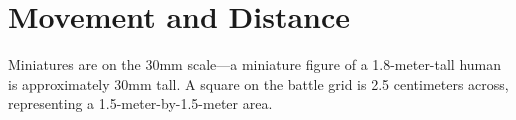 \section{Movement and Distance}
Miniatures are on the 30mm scale---a miniature figure of a 1.8-meter-tall human is approximately 30mm tall. A square on the battle grid is 2.5 centimeters across, representing a 1.5-meter-by-1.5-meter area.



